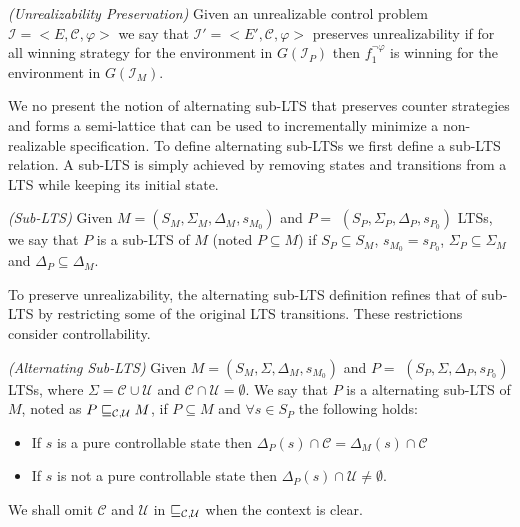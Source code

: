 
\begin{definition}\label{}\emph{(Unrealizability Preservation)}
Given an unrealizable control problem $\mathcal{I} = <E, \mathcal{C}, \varphi>$ we say
that $\mathcal{I'} = <E', \mathcal{C}, \varphi>$ preserves unrealizability
 if for all  winning strategy \counterS for
the environment in $G(\mathcal{I}_P)$ 
then $f_1^{\neg \varphi}$ is winning for the environment in
$G(\mathcal{I}_M)$.
\end{definition}

We no present the notion of alternating sub-LTS that preserves counter strategies and forms a semi-lattice that can be used to incrementally minimize a non-realizable specification. 
To define alternating sub-LTSs we first define a sub-LTS relation.  A sub-LTS is simply achieved by removing states and transitions from a LTS while keeping its initial state.

\begin{definition}\label{def:lts-inclusion}\emph{(Sub-LTS)}
Given $M = (S_M, \Sigma_M, \Delta_M, s_{M_0})$ and
 $P =$ $(S_P,\Sigma_P,\Delta_P,s_{P_0})$ LTSs, 
we say that $P$ is a sub-LTS of $M$ (noted $P \subseteq M$) if $S_P \subseteq S_M$,
$s_{M_0} = s_{P_0}$, $\Sigma_P \subseteq \Sigma_M$ and $\Delta_P \subseteq \Delta_M$.
\end{definition}

To preserve unrealizability, the alternating sub-LTS definition refines that of sub-LTS by restricting some of the original LTS transitions. 
These restrictions consider controllability. 

\begin{definition}\label{def:nonreal-legalEnvironment}\emph{(Alternating Sub-LTS)}
Given $M = (S_M, \Sigma, \Delta_M, s_{M_0})$ and
 $P =$ $(S_P,\Sigma,\Delta_P,s_{P_0})$ LTSs, 
where $\Sigma =\mathcal{C}\cup \mathcal{U}$ and $\mathcal{C}\cap
\mathcal{U}=\emptyset$. We say that $P$ is a alternating
 sub-LTS of $M$, noted as $P \sqsubseteq_{\mathcal{C},\mathcal{U}} M$, if  $P \subseteq M$  and $\forall s \in S_{P}$ the following holds:
 \begin{itemize}
\item If $s$ is a pure controllable state then $\Delta_{P}(s) \cap \mathcal{C} = \Delta_{M}(s) \cap \mathcal{C} $
\item If $s$ is not a pure controllable state then  
$\Delta_{P}(s) \cap \mathcal{U} \neq \emptyset$.
 \end{itemize}
 
We shall omit $\mathcal{C}$ and $\mathcal{U}$ in $\sqsubseteq_{\mathcal{C},\mathcal{U}}$ when the context is clear. 
 \end{definition}

